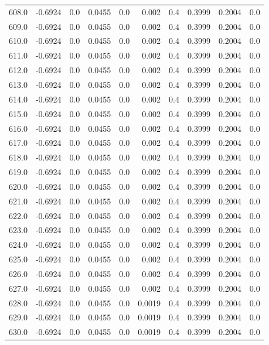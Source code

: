 \begin{longtable}{lrrrrrrrrr}
608.0 & -0.6924 & 0.0 & 0.0455 & 0.0 & 0.002 & 0.4 & 0.3999 & 0.2004 & 0.0 \\
609.0 & -0.6924 & 0.0 & 0.0455 & 0.0 & 0.002 & 0.4 & 0.3999 & 0.2004 & 0.0 \\
610.0 & -0.6924 & 0.0 & 0.0455 & 0.0 & 0.002 & 0.4 & 0.3999 & 0.2004 & 0.0 \\
611.0 & -0.6924 & 0.0 & 0.0455 & 0.0 & 0.002 & 0.4 & 0.3999 & 0.2004 & 0.0 \\
612.0 & -0.6924 & 0.0 & 0.0455 & 0.0 & 0.002 & 0.4 & 0.3999 & 0.2004 & 0.0 \\
613.0 & -0.6924 & 0.0 & 0.0455 & 0.0 & 0.002 & 0.4 & 0.3999 & 0.2004 & 0.0 \\
614.0 & -0.6924 & 0.0 & 0.0455 & 0.0 & 0.002 & 0.4 & 0.3999 & 0.2004 & 0.0 \\
615.0 & -0.6924 & 0.0 & 0.0455 & 0.0 & 0.002 & 0.4 & 0.3999 & 0.2004 & 0.0 \\
616.0 & -0.6924 & 0.0 & 0.0455 & 0.0 & 0.002 & 0.4 & 0.3999 & 0.2004 & 0.0 \\
617.0 & -0.6924 & 0.0 & 0.0455 & 0.0 & 0.002 & 0.4 & 0.3999 & 0.2004 & 0.0 \\
618.0 & -0.6924 & 0.0 & 0.0455 & 0.0 & 0.002 & 0.4 & 0.3999 & 0.2004 & 0.0 \\
619.0 & -0.6924 & 0.0 & 0.0455 & 0.0 & 0.002 & 0.4 & 0.3999 & 0.2004 & 0.0 \\
620.0 & -0.6924 & 0.0 & 0.0455 & 0.0 & 0.002 & 0.4 & 0.3999 & 0.2004 & 0.0 \\
621.0 & -0.6924 & 0.0 & 0.0455 & 0.0 & 0.002 & 0.4 & 0.3999 & 0.2004 & 0.0 \\
622.0 & -0.6924 & 0.0 & 0.0455 & 0.0 & 0.002 & 0.4 & 0.3999 & 0.2004 & 0.0 \\
623.0 & -0.6924 & 0.0 & 0.0455 & 0.0 & 0.002 & 0.4 & 0.3999 & 0.2004 & 0.0 \\
624.0 & -0.6924 & 0.0 & 0.0455 & 0.0 & 0.002 & 0.4 & 0.3999 & 0.2004 & 0.0 \\
625.0 & -0.6924 & 0.0 & 0.0455 & 0.0 & 0.002 & 0.4 & 0.3999 & 0.2004 & 0.0 \\
626.0 & -0.6924 & 0.0 & 0.0455 & 0.0 & 0.002 & 0.4 & 0.3999 & 0.2004 & 0.0 \\
627.0 & -0.6924 & 0.0 & 0.0455 & 0.0 & 0.002 & 0.4 & 0.3999 & 0.2004 & 0.0 \\
628.0 & -0.6924 & 0.0 & 0.0455 & 0.0 & 0.0019 & 0.4 & 0.3999 & 0.2004 & 0.0 \\
629.0 & -0.6924 & 0.0 & 0.0455 & 0.0 & 0.0019 & 0.4 & 0.3999 & 0.2004 & 0.0 \\
630.0 & -0.6924 & 0.0 & 0.0455 & 0.0 & 0.0019 & 0.4 & 0.3999 & 0.2004 & 0.0 \\

\end{longtable}
